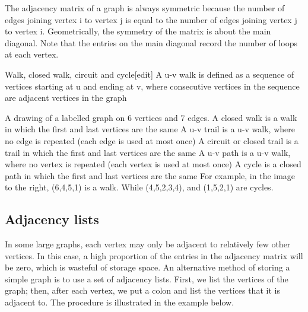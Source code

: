 \documentclass{article}
\begin{document}
The adjacency matrix of a graph is always symmetric because the number of edges joining vertex i to vertex j is equal to the number of edges joining vertex j to vertex i. Geometrically, the symmetry of the matrix is about the main diagonal. Note that the entries on the main diagonal record the number of loops at each vertex.


Walk, closed walk, circuit and cycle[edit]
A u-v walk is defined as a sequence of vertices starting at u and ending at v, where consecutive vertices in the sequence are adjacent vertices in the graph

A drawing of a labelled graph on 6 vertices and 7 edges.
A closed walk is a walk in which the first and last vertices are the same
A u-v trail is a u-v walk, where no edge is repeated (each edge is used at most once)
A circuit or closed trail is a trail in which the first and last vertices are the same
A u-v path is a u-v walk, where no vertex is repeated (each vertex is used at most once)
A cycle is a closed path in which the first and last vertices are the same
For example, in the image to the right, (6,4,5,1) is a walk. While (4,5,2,3,4), and (1,5,2,1) are cycles.


\subsection*{Adjacency lists}

In some large graphs, each vertex may only be adjacent to relatively few other vertices. In this case, a high proportion of the entries in the adjacency matrix will be zero, which is wasteful of storage space. An alternative method of storing a simple graph is to use a set of adjacency lists. First, we list the vertices of the graph; then, after each vertex, we put a colon and list the vertices that it is adjacent to. The procedure is illustrated in the example below.
\end{document}
